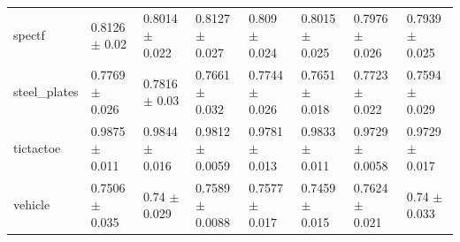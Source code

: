 \begin{tabular}{llllllll}
spectf & 0.8126 $\pm$ 0.02 & 0.8014 $\pm$ 0.022 & 0.8127 $\pm$ 0.027 & 0.809 $\pm$ 0.024 & 0.8015 $\pm$ 0.025 & 0.7976 $\pm$ 0.026 & 0.7939 $\pm$ 0.025 \\
steel\_plates & 0.7769 $\pm$ 0.026 & 0.7816 $\pm$ 0.03 & 0.7661 $\pm$ 0.032 & 0.7744 $\pm$ 0.026 & 0.7651 $\pm$ 0.018 & 0.7723 $\pm$ 0.022 & 0.7594 $\pm$ 0.029 \\
tictactoe & 0.9875 $\pm$ 0.011 & 0.9844 $\pm$ 0.016 & 0.9812 $\pm$ 0.0059 & 0.9781 $\pm$ 0.013 & 0.9833 $\pm$ 0.011 & 0.9729 $\pm$ 0.0058 & 0.9729 $\pm$ 0.017 \\
vehicle & 0.7506 $\pm$ 0.035 & 0.74 $\pm$ 0.029 & 0.7589 $\pm$ 0.0088 & 0.7577 $\pm$ 0.017 & 0.7459 $\pm$ 0.015 & 0.7624 $\pm$ 0.021 & 0.74 $\pm$ 0.033 \\
\bottomrule
\end{tabular}
